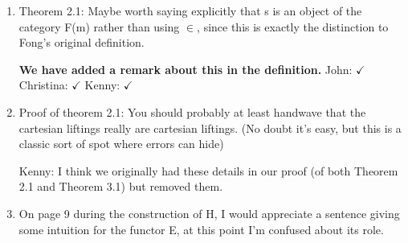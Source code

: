 \documentclass[reqno]{amsart}
\def\chris{\color{purple} Christina: }
\def\john{\color{red} John: }
\def\kenny{\color{blue} Kenny: }
\begin{document}
\begin{enumerate}
{\bf It is indeed the case that we use what some people call ``covariant'' version of the Grothendieck construction in this paper, however we believe 
that mentioning this in the introduction could put people off if they haven't heard of it. We added a footnote about this in the 
appendix.} {\chris $\checkmark$} {\kenny $\checkmark$}

{\chris Not sure that `covariant' would make this clearer...both are very well the Grothendieck construction I would think, but I don't mind that 
much.}

{\kenny Agree with Christina.}

{\chris See if you like the answer.}

{\kenny Looks good.}

\item Theorem 2.1: Maybe worth saying explicitly that s is an object of the category F(m) rather than using $\in$, since this is exactly the 
distinction to 
Fong's original definition.

{\bf  We have added a remark about this in the definition.}   {\john $\checkmark$} {\chris $\checkmark$} {\kenny $\checkmark$}




\item Proof of theorem 2.1: You should probably at least handwave that the cartesian liftings really are cartesian liftings. (No doubt it’s easy, but 
this 
is a classic sort of spot where errors can hide)

{\kenny I think we originally had these details in our proof (of both Theorem 2.1 and Theorem 3.1) but removed them.}

\item On page 9 during the construction of H, I would appreciate a sentence giving some intuition for the functor E, at this point I’m confused about 
its 
role.


\end{enumerate}
\end{document}
